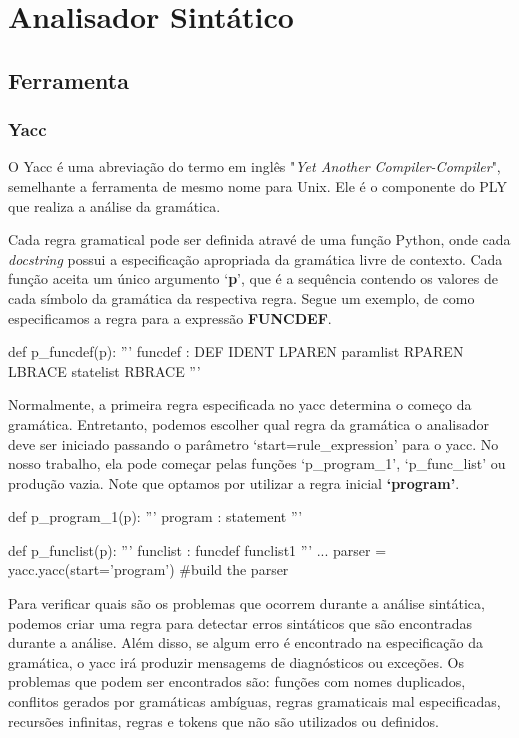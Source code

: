 \documentclass[
	12pt,				%
	openright,			%
	twoside,			%
	a4paper,			%
	english,			%
	french,				%
	spanish,			%
	brazil				%
	]{abntex2}
\begin{document}
\part{Analisador Sintático}
\chapter{Ferramenta}
\section{Yacc}
O Yacc é uma abreviação do termo em inglês "\emph{Yet Another Compiler-Compiler}",
semelhante a ferramenta de mesmo nome para Unix. Ele é o componente do PLY que realiza
a análise da gramática.

Cada regra gramatical pode ser definida atravé de uma função Python, onde cada \emph{docstring} possui
a especificação apropriada da gramática livre de contexto. Cada função aceita um
único argumento `\textbf{p}', que é a sequência contendo os valores de cada símbolo da gramática
da respectiva regra. Segue um exemplo, de como especificamos a regra para a expressão \textbf{FUNCDEF}.

\begin{python}
def p_funcdef(p):
    '''
    funcdef : DEF IDENT LPAREN paramlist RPAREN LBRACE statelist RBRACE
    '''
\end{python}

Normalmente, a primeira regra especificada no yacc determina o começo da gramática.
Entretanto, podemos escolher qual regra da gramática o analisador deve ser iniciado
passando o parâmetro `start=rule\_expression' para o yacc. No nosso trabalho,
ela pode começar pelas funções `p\_program\_1', `p\_func\_list' ou
produção vazia. Note que optamos por utilizar a regra inicial \textbf{`program'}. 

\begin{python}
def p_program_1(p):
    '''
    program : statement
    '''

def p_funclist(p):
    '''
    funclist : funcdef funclist1
    '''
...
parser = yacc.yacc(start='program')  #build the parser
\end{python}

Para verificar quais são os problemas que ocorrem durante a análise sintática, podemos criar
uma regra para detectar erros sintáticos que são encontradas durante a análise. Além disso,
se algum erro é encontrado na especificação da gramática, o yacc irá produzir mensagems de 
diagnósticos ou exceções. Os problemas que podem ser encontrados são: funções com nomes duplicados,
conflitos gerados por gramáticas ambíguas, regras gramaticais mal especificadas, recursões infinitas,
regras e tokens que não são utilizados ou definidos.
\end{document}
